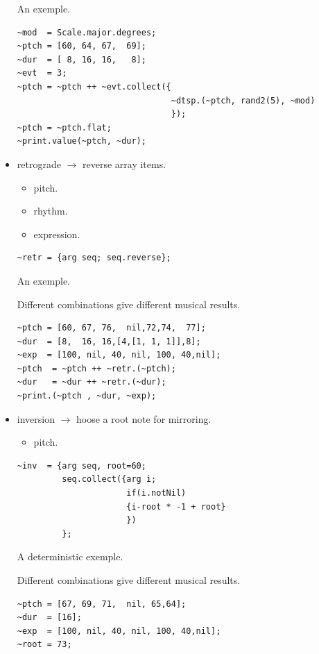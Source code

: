 \begin{itemize}
An exemple.

\begin{lstlisting}[frame=single] 
~mod  = Scale.major.degrees;
~ptch = [60, 64, 67,  69];
~dur  = [ 8, 16, 16,   8];
~evt  = 3;
~ptch = ~ptch ++ ~evt.collect({ 
                               ~dtsp.(~ptch, rand2(5), ~mod) 
                               });
~ptch = ~ptch.flat;
~print.value(~ptch, ~dur);
\end{lstlisting}

\item retrograde \(\rightarrow\) reverse array items.
    \begin{itemize}
    \tightlist
    \item pitch.
    \item rhythm.
    \item expression.
    \end{itemize}

\begin{lstlisting}[frame=single, caption=retrograde function] 
~retr = {arg seq; seq.reverse};
\end{lstlisting}

An exemple.

Different combinations give different musical results.
\begin{lstlisting}[frame=single] 
~ptch = [60, 67, 76,  nil,72,74,  77];
~dur  = [8,  16, 16,[4,[1, 1, 1]],8];
~exp  = [100, nil, 40, nil, 100, 40,nil];
~ptch  = ~ptch ++ ~retr.(~ptch);
~dur   = ~dur ++ ~retr.(~dur);
~print.(~ptch , ~dur, ~exp);
\end{lstlisting}

\item inversion \(\rightarrow\) hoose a root note for mirroring.
    \begin{itemize}
    \tightlist
    \item pitch.
    \end{itemize}

\begin{lstlisting}[frame=single, caption=inversion function] 
~inv  = {arg seq, root=60;
         seq.collect({arg i;
                      if(i.notNil)
                      {i-root * -1 + root}
                      })
         };
\end{lstlisting}

A deterministic exemple.

Different combinations give different musical results.

\begin{lstlisting}
~ptch = [67, 69, 71,  nil, 65,64];
~dur  = [16];
~exp  = [100, nil, 40, nil, 100, 40,nil];
~root = 73;


\end{lstlisting}
\end{itemize}
